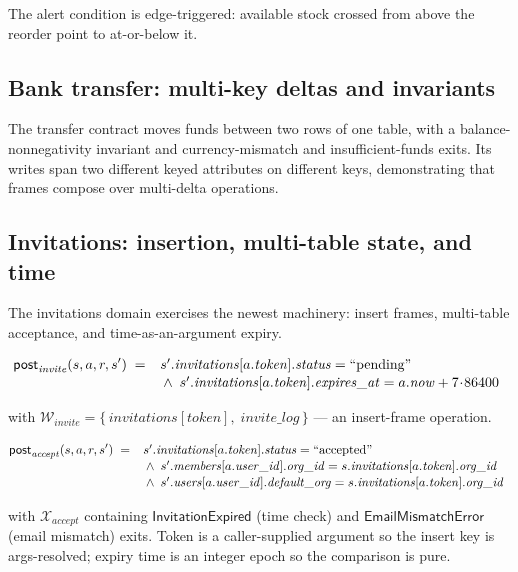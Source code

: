 \documentclass[11pt,a4paper]{article}
\begin{document}
The alert condition is edge-triggered: available stock crossed from
above the reorder point to at-or-below it.

\subsection{Bank transfer: multi-key deltas and invariants}

The transfer contract moves funds between two rows of one table, with
a balance-nonnegativity invariant and currency-mismatch and
insufficient-funds exits.  Its writes span two different keyed
attributes on different keys, demonstrating that frames compose over
multi-delta operations.

\subsection{Invitations: insertion, multi-table state, and time}

The invitations domain exercises the newest machinery: insert frames,
multi-table acceptance, and time-as-an-argument expiry.

\[
\mathsf{post}_{\mathit{invite}}(s,a,r,s') \;=\;
\begin{array}[t]{l}
s'.\mathit{invitations}[a.\mathit{token}].\mathit{status} = \text{``pending''} \\[1pt]
{}\wedge\; s'.\mathit{invitations}[a.\mathit{token}].\mathit{expires\_at}
       = a.\mathit{now} + 7\!\cdot\!86400
\end{array}
\]

with $\mathcal{W}_{\mathit{invite}} = \{\,\mathit{invitations}[token],\;
\mathit{invite\_log}\,\}$ --- an insert-frame operation.

\[
\mathsf{post}_{\mathit{accept}}(s,a,r,s') \;=\;
\begin{array}[t]{l}
s'.\mathit{invitations}[a.\mathit{token}].\mathit{status} = \text{``accepted''} \\[1pt]
{}\wedge\; s'.\mathit{members}[a.\mathit{user\_id}].\mathit{org\_id}
       = s.\mathit{invitations}[a.\mathit{token}].\mathit{org\_id} \\[1pt]
{}\wedge\; s'.\mathit{users}[a.\mathit{user\_id}].\mathit{default\_org}
       = s.\mathit{invitations}[a.\mathit{token}].\mathit{org\_id}
\end{array}
\]

with $\mathcal{X}_{\mathit{accept}}$ containing
$\mathsf{InvitationExpired}$ (time check) and
$\mathsf{EmailMismatchError}$ (email mismatch) exits.  Token is a
caller-supplied argument so the insert key is args-resolved; expiry
time is an integer epoch so the comparison is pure.
\end{document}
